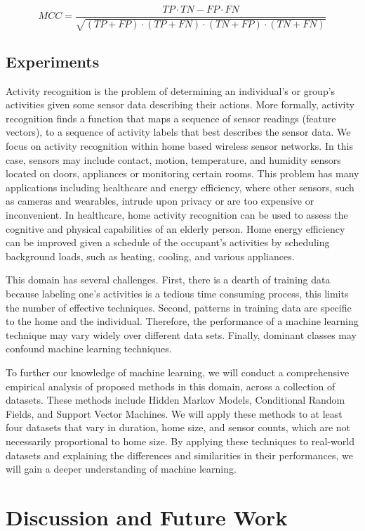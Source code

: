 \documentclass[11pt, oneside]{article}   	%
\begin{document}
\begin{equation}
MCC=\frac{TP\cdot TN-FP\cdot FN}{\sqrt{(TP+FP)\cdot (TP+FN)\cdot (TN+FP)\cdot (TN+FN)}}
\end{equation}


\subsection{Experiments}

	Activity recognition is the problem of determining an individual's or group's activities given some sensor data describing their actions.
	More formally, activity recognition finds a function that maps a sequence of sensor readings (feature vectors), to a sequence of activity labels that best describes the sensor data.
	We focus on activity recognition within home based wireless sensor networks.
	In this case, sensors may include contact, motion, temperature, and humidity sensors located on doors, appliances or monitoring certain rooms.
	This problem has many applications including healthcare and energy efficiency, where other sensors, such as cameras and wearables, intrude upon privacy or are too expensive or inconvenient.
	In healthcare, home activity recognition can be used to assess the cognitive and physical capabilities of an elderly person.
	Home energy efficiency can be improved given a schedule of the occupant's activities by scheduling background loads, such as heating, cooling, and various appliances.

	This domain has several challenges.
	First, there is a dearth of training data because labeling one's activities is a tedious time consuming process, this limits the number of effective techniques.
	Second, patterns in training data are specific to the home and the individual.
	Therefore, the performance of a machine learning technique may vary widely over different data sets.
	Finally, dominant classes may confound machine learning techniques.

	To further our knowledge of machine learning, we will conduct a comprehensive empirical analysis of proposed methods in this domain, across a collection of datasets.
	These methods include Hidden Markov Models, Conditional Random Fields, and Support Vector Machines.
	We will apply these methods to at least four datasets that vary in duration, home size, and sensor counts, which are not necessarily proportional to home size.
	By applying these techniques to real-world datasets and explaining the differences and similarities in their performances, we will gain a deeper understanding of machine learning.

\section{Discussion and Future Work}
\end{document}
